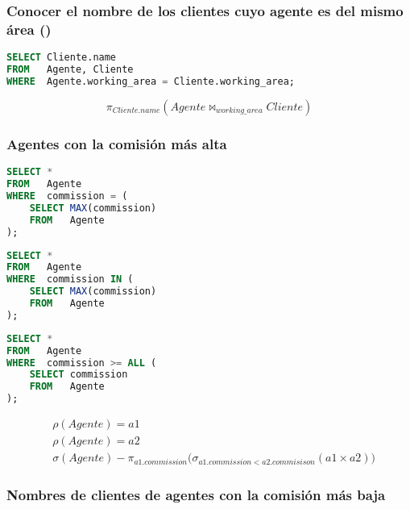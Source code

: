 \section{}

\subsubsection{Conocer el nombre de los clientes cuyo agente es del mismo área ()}

\begin{lstlisting}[language=SQL]
SELECT Cliente.name
FROM   Agente, Cliente
WHERE  Agente.working_area = Cliente.working_area;
\end{lstlisting}

\[\pi_{Cliente.name}(Agente\bowtie_{working\_area}Cliente)\]

\subsubsection{Agentes con la comisión más alta}

\begin{lstlisting}[language=SQL]
SELECT *
FROM   Agente
WHERE  commission = (
	SELECT MAX(commission)
	FROM   Agente
);
\end{lstlisting}

\begin{lstlisting}[language=SQL]
SELECT *
FROM   Agente
WHERE  commission IN (
	SELECT MAX(commission)
	FROM   Agente
);
\end{lstlisting}

\begin{lstlisting}[language=SQL]
SELECT *
FROM   Agente
WHERE  commission >= ALL (
	SELECT commission
	FROM   Agente
);
\end{lstlisting}

\[
\begin{split}
	& \rho(Agente)=a1 \\
	& \rho(Agente)=a2 \\
	& \sigma(Agente)-\pi_{a1.commission}\big(\sigma_{a1.commission<a2.commisison}(a1\times a2)\big)
\end{split}
\]

\pagebreak

\subsubsection{Nombres de clientes de agentes con la comisión más baja}

